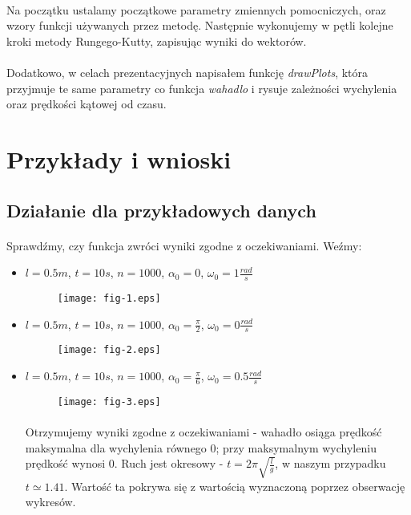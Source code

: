 \documentclass{article}
\begin{document}
\paragraph{}
Na początku ustalamy początkowe parametry zmiennych pomocniczych, oraz wzory funkcji używanych przez metodę. Następnie wykonujemy w pętli kolejne kroki metody Rungego-Kutty, zapisując wyniki do wektorów.
\paragraph{}
Dodatkowo, w celach prezentacyjnych napisałem funkcję \textit{drawPlots}, która przyjmuje te same parametry co funkcja \textit{wahadlo} i rysuje zależności wychylenia oraz prędkości kątowej od czasu.
\pagebreak
\section{Przykłady i wnioski}
\subsection{Działanie dla przykładowych danych}
\paragraph{}
Sprawdźmy, czy funkcja zwróci wyniki zgodne z oczekiwaniami. Weźmy:
\begin{itemize}
\item $l = 0.5m$, $t = 10s$, $n = 1000$, $\alpha_0 = 0$, $\omega_0 = 1 \frac{rad}{s}$
\begin{figure}[H]
  \texttt{[image: fig-1.eps]}
\end{figure}
\item $l = 0.5m$, $t = 10s$, $n = 1000$, $\alpha_0 = \frac{\pi}{2}$, $\omega_0 = 0
 \frac{rad}{s}$
\begin{figure}[H]
  \texttt{[image: fig-2.eps]}
\end{figure}
\item $l = 0.5m$, $t = 10s$, $n = 1000$, $\alpha_0 = \frac{\pi}{6}$, $\omega_0 = 0.5
 \frac{rad}{s}$
\begin{figure}[H]
  \texttt{[image: fig-3.eps]}
\end{figure}
\paragraph{}
Otrzymujemy wyniki zgodne z oczekiwaniami - wahadło osiąga prędkość maksymalna dla wychylenia równego 0; przy maksymalnym wychyleniu prędkość wynosi 0. Ruch jest okresowy - $t = 2 \pi \sqrt{\frac{l}{g}}$, w naszym przypadku $t \simeq 1.41$. Wartość ta pokrywa się z wartością wyznaczoną poprzez obserwację wykresów.
\end{itemize}
\end{document}

